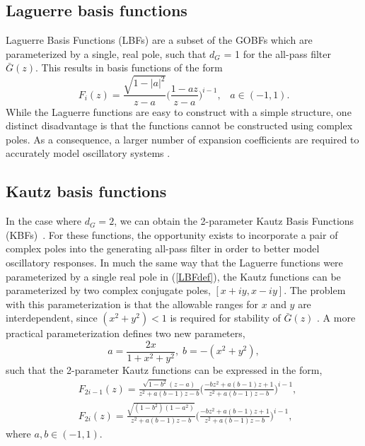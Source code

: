 \subsection{Laguerre basis functions}
\label{sec:LBFdef}

Laguerre Basis Functions (LBFs) are a subset of the GOBFs which are parameterized by a single, real pole, such that $d_G$ = 1 for the all-pass filter $\bar{G}(z)$. This results in basis functions of the form
\begin{equation}
\label{LBFdef}
F_i(z) = \frac{\sqrt{1-|a|^2}}{z-a} \bigg( \frac{1-a z}{z-a} \bigg) ^{i-1}, \; \; \; a \in (-1,1).
\end{equation}
While the Laguerre functions are easy to construct with a simple structure, one distinct disadvantage is that the functions cannot be constructed using complex poles. As a consequence, a larger number of expansion coefficients are required to accurately model oscillatory systems \cite{Wahlberg1991}.  

\subsection{Kautz basis functions}
\label{sec:KBFdef}

In the case where $d_G = 2$, we can obtain the 2-parameter Kautz Basis Functions (KBFs)~\cite{Wahlberg1994}.  For these functions, the opportunity exists to incorporate a pair of complex poles into the generating all-pass filter in order to better model oscillatory responses.  In much the same way that the Laguerre functions were parameterized by a single real pole in (\ref{LBFdef}), the Kautz functions can be parameterized by two complex conjugate poles,  $[x+iy , x-iy]$. The problem with this parameterization is that the allowable ranges for $x$ and $y$ are interdependent, since $(x^2 + y^2) <1$ is required for stability of $\bar{G}(z)$ \cite{Heuberger2005}.  A more practical parameterization defines two new parameters,
$$a = \frac{2x}{1+x^2+y^2}, \; b = -(x^2+y^2),$$
such that the 2-parameter Kautz functions can be expressed in the form,
\begin{equation}
\begin{split}
\label{KBFdef}
&F_{2i-1}(z) = \frac{\sqrt{1-b^2}(z-a)}{z^2+a(b-1)z-b} \bigg( \frac{-b z^2 + a(b-1)z + 1}{z^2 + a(b-1)z - b} \bigg)^{i-1}, \\
&F_{2i}(z) = \frac{\sqrt{(1-b^2)(1-a^2)}}{z^2+a(b-1)z-b} \bigg( \frac{-b z^2 + a(b-1)z + 1}{z^2 + a(b-1)z - b} \bigg)^{i-1},
\end{split}
\end{equation}
where $a,b \in (-1,1)$. 

